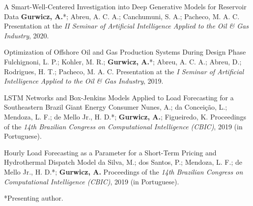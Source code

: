 \cvpublication
    {A Smart-Well-Centered Investigation into Deep Generative Models for Reservoir Data}
    {\textbf{Gurwicz, A.}*; Abreu, A. C. A.; Canchumuni, S. A.; Pacheco, M. A. C.}
    {Presentation at the \textit{II Seminar of Artificial Intelligence Applied to the Oil \& Gas Industry}, 2020.}

\cvpublication
    {Optimization of Offshore Oil and Gas Production Systems During Design Phase}
    {Fulchignoni, L. P.; Kohler, M. R.; \textbf{Gurwicz, A.}*; Abreu, A. C. A.; Abreu, D.; Rodrigues, H. T.;
    Pacheco, M. A. C.}
    {Presentation at the \textit{I Seminar of Artificial Intelligence Applied to the Oil \& Gas Industry}, 2019.}

\cvpublication
    {LSTM Networks and Box-Jenkins Models Applied to Load Forecasting for a Southeastern Brazil Giant Energy Consumer}
    {Nunes, A.; da Conceição, L.; Mendoza, L. F.; de Mello Jr., H. D.*; \textbf{Gurwicz, A.}; Figueiredo, K.}
    {Proceedings of the \textit{14th Brazilian Congress on Computational Intelligence (CBIC)}, 2019 (in Portuguese).
    }

\cvpublication
    {Hourly Load Forecasting as a Parameter for a Short-Term Pricing and Hydrothermal Dispatch Model}
    {da Silva, M.; dos Santos, P.; Mendoza, L. F.; de Mello Jr., H. D.*; \textbf{Gurwicz, A.}}
    {Proceedings of the \textit{14th Brazilian Congress on Computational Intelligence (CBIC)}, 2019 (in Portuguese).
    }

\vspace{0.8em} *Presenting author.
